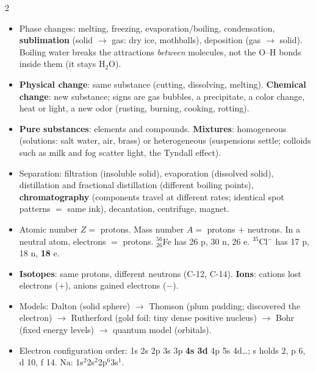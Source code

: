 \documentclass[10pt]{article}
\makeatletter
\newcommand{\sub}[1]{\par\vspace{2.5pt}{\sffamily\bfseries\color{dblue}#1}\par\nobreak\vspace{0.5pt}\@afterheading}
\newcommand{\term}[1]{\textbf{\color{dnavy}#1}}
\newcounter{fig}
\makeatother
\begin{document}
\begin{multicols}{2}
\sub{A. Matter and its changes}
\begin{itemize}
\item Phase changes: melting, freezing, evaporation/boiling, condensation, \textbf{sublimation} (solid $\to$ gas: dry ice, mothballs), deposition (gas $\to$ solid). Boiling water breaks the attractions \emph{between} molecules, not the O--H bonds inside them (it stays H$_2$O).
\item \term{Physical change}: same substance (cutting, dissolving, melting). \term{Chemical change}: new substance; signs are gas bubbles, a precipitate, a color change, heat or light, a new odor (rusting, burning, cooking, rotting).
\item \term{Pure substances}: elements and compounds. \term{Mixtures}: homogeneous (solutions: salt water, air, brass) or heterogeneous (suspensions settle; colloids such as milk and fog scatter light, the Tyndall effect).
\item Separation: filtration (insoluble solid), evaporation (dissolved solid), distillation and fractional distillation (different boiling points), \textbf{chromatography} (components travel at different rates; identical spot patterns $=$ same ink), decantation, centrifuge, magnet.
\end{itemize}

\sub{B. Atoms}
\begin{itemize}
\item Atomic number $Z=$ protons. Mass number $A=$ protons $+$ neutrons. In a neutral atom, electrons $=$ protons. $^{56}_{26}$Fe has 26 p, 30 n, 26 e. $^{35}$Cl$^-$ has 17 p, 18 n, \textbf{18} e.
\item \term{Isotopes}: same protons, different neutrons (C-12, C-14). \term{Ions}: cations lost electrons ($+$), anions gained electrons ($-$).
\item Models: Dalton (solid sphere) $\to$ Thomson (plum pudding; discovered the electron) $\to$ Rutherford (gold foil: tiny dense positive nucleus) $\to$ Bohr (fixed energy levels) $\to$ quantum model (orbitals).
\item Electron configuration order: 1s 2s 2p 3s 3p \textbf{4s 3d} 4p 5s 4d\ldots; s holds 2, p 6, d 10, f 14. Na: 1s$^2$2s$^2$2p$^6$3s$^1$.
\end{itemize}


\end{multicols}
\end{document}
